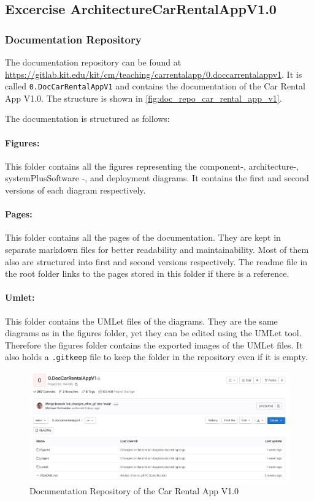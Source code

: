 \subsection{Excercise ArchitectureCarRentalAppV1.0}
\label{sec:architecture_car_rental_app_v1_0}
\subsubsection*{Documentation Repository}
The documentation repository can be found at \url{https://gitlab.kit.edu/kit/cm/teaching/carrentalapp/0.doccarrentalappv1}.
It is called \texttt{0.DocCarRentalAppV1} and contains the documentation of the Car Rental App V1.0.
The structure is shown in \autoref{fig:doc_repo_car_rental_app_v1}.

The documentation is structured as follows:
\paragraph*{Figures:}
This folder contains all the figures representing the component-, architecture-, systemPlusSoftware -, and deployment diagrams.
It contains the first and second versions of each diagram respectively.
\paragraph*{Pages:}
This folder contains all the pages of the documentation.
They are kept in separate markdown files for better readability and maintainability.
Most of them also are structured into first and second versions respectively.
The readme file in the root folder links to the pages stored in this folder if there is a reference.
\paragraph*{Umlet:}
This folder contains the UMLet files of the diagrams.
They are the same diagrams as in the figures folder, yet they can be edited using the UMLet tool.
Therefore the figures folder contains the exported images of the UMLet files.
It also holds a \texttt{.gitkeep} file to keep the folder in the repository even if it is empty.

\begin{figure}
    \centering
    \includegraphics[width=\textwidth]{figures/microservices/introduction/ms_intro_docRepo.png}
    \caption{Documentation Repository of the Car Rental App V1.0}
    \label{fig:doc_repo_car_rental_app_v1}
\end{figure}

